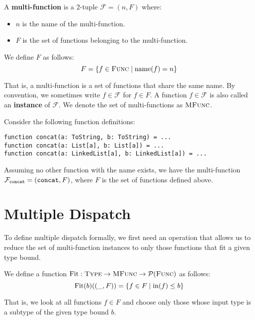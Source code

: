 \noindent A \textbf{multi-function} is a 2-tuple $\mathcal{F} = (n, F)$ where:
\begin{itemize}
	\item $n$ is the name of the multi-function.
	\item $F$ is the set of functions belonging to the multi-function.
\end{itemize}

\noindent We define $F$ as follows:
\begin{equation*}
	F = \{ f \in \textsc{Func} \mid \operatorname{name}(f) = n \}
\end{equation*}

\noindent That is, a multi-function is a set of functions that share the same name. By convention, we sometimes write $f \in \mathcal{F}$ for $f \in F$. A function $f \in \mathcal{F}$ is also called an \textbf{instance} of $\mathcal{F}$. We denote the set of multi-functions as $\textsc{MFunc}$.

\begin{example}
	Consider the following function definitions:
	\begin{lstlisting}
function concat(a: ToString, b: ToString) = ...
function concat(a: List[a], b: List[a]) = ...
function concat(a: LinkedList[a], b: LinkedList[a]) = ...
	\end{lstlisting}
	
	\noindent Assuming no other function with the name  exists, we have the multi-function $\mathcal{F}_{\text{\texttt{concat}}} = (\text{\texttt{concat}}, F)$, where $F$ is the set of  functions defined above.
\end{example}



\section{Multiple Dispatch}

To define multiple dispatch formally, we first need an operation that allows us to reduce the set of multi-function instances to only those functions that fit a given type bound.

We define a function $\operatorname{Fit} : \textsc{Type} \rightarrow \textsc{MFunc} \rightarrow \mathcal{P}(\textsc{Func})$ as follows:
\begin{equation*}
	\operatorname{Fit}(b)((\_, F)) = \{ f \in F \mid \operatorname{in}(f) \leq b \}
\end{equation*}

\noindent That is, we look at all functions $f \in F$ and choose only those whose input type is a subtype of the given type bound $b$.





